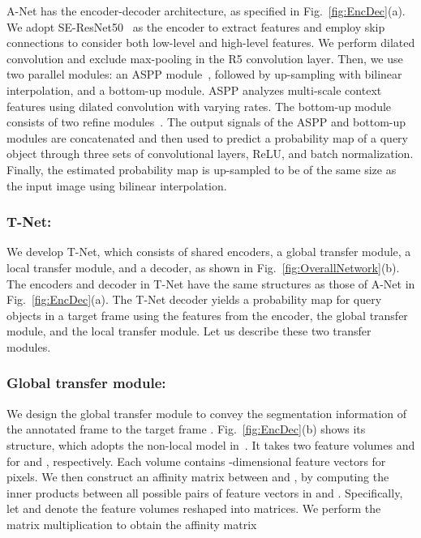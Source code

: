 \documentclass[runningheads]{llncs}
\begin{document}
A-Net has the encoder-decoder architecture, as specified in Fig.~\ref{fig:EncDec}(a). We adopt SE-ResNet50~\cite{hu2018squeeze} as the encoder to extract features and employ skip connections to consider both low-level and high-level features. We perform dilated convolution and exclude max-pooling in the R5 convolution layer. Then, we use two parallel modules: an ASPP module~\cite{chen2018encoder}, followed by up-sampling with bilinear interpolation, and a bottom-up module. ASPP analyzes multi-scale context features using dilated convolution with varying rates. The bottom-up module consists of two refine modules~\cite{Oh2018CVPR}. The output signals of the ASPP and bottom-up modules are concatenated and then used to predict a probability map of a query object through three sets of convolutional layers, ReLU, and batch normalization. Finally, the estimated probability map is up-sampled to be of the same size as the input image using bilinear interpolation.

\subsubsection{T-Net:} \label{subsubsec:PTNet}
We develop T-Net, which consists of shared encoders, a global transfer module, a local transfer module, and a decoder, as shown in Fig.~\ref{fig:OverallNetwork}(b). The encoders and decoder in T-Net have the same structures as those of A-Net in Fig.~\ref{fig:EncDec}(a). The T-Net decoder yields a probability map for query objects in a target frame  using the features from the encoder, the global transfer module, and the local transfer module. Let us describe these two transfer modules.

\subsubsection{Global transfer module:} \label{subsubsec:Transition}
We design the global transfer module to convey the segmentation information of the annotated frame  to the target frame . Fig.~\ref{fig:EncDec}(b) shows its structure, which adopts the non-local model in~\cite{wang2018non}. It takes two feature volumes  and  for  and , respectively. Each volume contains -dimensional feature vectors for  pixels. We then construct an affinity matrix  between  and , by computing the inner products between all possible pairs of feature vectors in  and . Specifically, let  and  denote the feature volumes reshaped into matrices. We perform the matrix multiplication to obtain the affinity matrix
\end{document}
